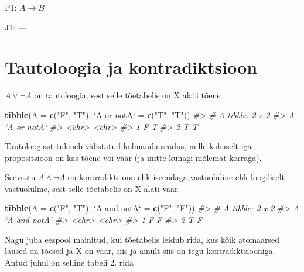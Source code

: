\documentclass[]{book}
\newenvironment{Shaded}{\begin{snugshade}}{\end{snugshade}}
\newcommand{\CommentTok}[1]{\textcolor[rgb]{0.56,0.35,0.01}{\textit{#1}}}
\newcommand{\DataTypeTok}[1]{\textcolor[rgb]{0.13,0.29,0.53}{#1}}
\newcommand{\KeywordTok}[1]{\textcolor[rgb]{0.13,0.29,0.53}{\textbf{#1}}}
\newcommand{\NormalTok}[1]{#1}
\newcommand{\StringTok}[1]{\textcolor[rgb]{0.31,0.60,0.02}{#1}}
\begin{document}
P1: \(A \rightarrow B\)

J1: ---

\hypertarget{tautoloogia-ja-kontradiktsioon}{%
\section{Tautoloogia ja kontradiktsioon}\label{tautoloogia-ja-kontradiktsioon}}

\(A \lor \neg A\) on tautoloogia, sest selle tõetabelis on X alati tõene

\begin{Shaded}
\begin{Highlighting}[]
\KeywordTok{tibble}\NormalTok{(}\DataTypeTok{A =} \KeywordTok{c}\NormalTok{(}\StringTok{"F"}\NormalTok{, }\StringTok{"T"}\NormalTok{), }\StringTok{`}\DataTypeTok{A or notA}\StringTok{`}\NormalTok{ =}\StringTok{ }\KeywordTok{c}\NormalTok{(}\StringTok{"T"}\NormalTok{, }\StringTok{"T"}\NormalTok{))}
\CommentTok{#> # A tibble: 2 x 2}
\CommentTok{#>   A     `A or notA`}
\CommentTok{#>   <chr> <chr>      }
\CommentTok{#> 1 F     T          }
\CommentTok{#> 2 T     T}
\end{Highlighting}
\end{Shaded}

Tautoloogiast tuleneb välistatud kolmanda seadus, mille kohaselt iga propositsioon on kas tõene või väär (ja mitte kunagi mõlemat korraga).

Seevastu \(A \land \neg A\) on kontradiktsioon ehk iseendaga vastuoluline ehk loogiliselt vastuoluline, sest selle tõetabelis on X alati väär.

\begin{Shaded}
\begin{Highlighting}[]
\KeywordTok{tibble}\NormalTok{(}\DataTypeTok{A =} \KeywordTok{c}\NormalTok{(}\StringTok{"F"}\NormalTok{, }\StringTok{"T"}\NormalTok{), }\StringTok{`}\DataTypeTok{A and notA}\StringTok{`}\NormalTok{ =}\StringTok{ }\KeywordTok{c}\NormalTok{(}\StringTok{"F"}\NormalTok{, }\StringTok{"F"}\NormalTok{))}
\CommentTok{#> # A tibble: 2 x 2}
\CommentTok{#>   A     `A and notA`}
\CommentTok{#>   <chr> <chr>       }
\CommentTok{#> 1 F     F           }
\CommentTok{#> 2 T     F}
\end{Highlighting}
\end{Shaded}

Nagu juba eespool mainitud, kui tõetabelis leidub rida, kus kõik atomaarsed laused on tõesed ja X on väär, siis ja ainult siis on tegu kontradiktsiooniga. Antud juhul on selline tabeli 2. rida
\end{document}
